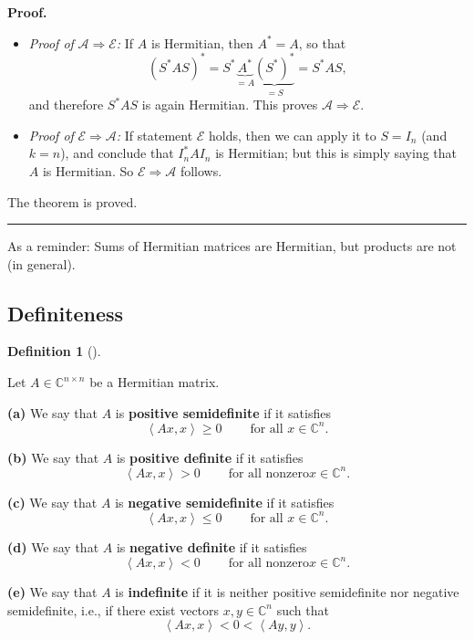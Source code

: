 \documentclass[numbers=enddot,12pt,final,onecolumn,notitlepage]{scrartcl}%
\numberwithin{exer}{subsection}
\theoremstyle{definition}
\newtheorem{defi}[theo]{Definition}
\newenvironment{definition}[1][]
{\begin{defi}[#1]\begin{leftbar}}
{\end{leftbar}\end{defi}}
\newenvironment{proof}[1][Proof]{\noindent\textbf{#1.} }{\ \rule{0.5em}{0.5em}}
\begin{document}
\begin{proof}
\begin{itemize}
\item \textit{Proof of }$\mathcal{A}\Longrightarrow\mathcal{E}$\textit{:} If
$A$ is Hermitian, then $A^{\ast}=A$, so that%
\[
\left(  S^{\ast}AS\right)  ^{\ast}=S^{\ast}\underbrace{A^{\ast}}%
_{=A}\underbrace{\left(  S^{\ast}\right)  ^{\ast}}_{=S}=S^{\ast}AS,
\]
and therefore $S^{\ast}AS$ is again Hermitian. This proves $\mathcal{A}%
\Longrightarrow\mathcal{E}$.

\item \textit{Proof of }$\mathcal{E}\Longrightarrow\mathcal{A}$\textit{:} If
statement $\mathcal{E}$ holds, then we can apply it to $S=I_{n}$ (and $k=n$),
and conclude that $I_{n}^{\ast}AI_{n}$ is Hermitian; but this is simply saying
that $A$ is Hermitian. So $\mathcal{E}\Longrightarrow\mathcal{A}$ follows.
\end{itemize}

The theorem is proved.
\end{proof}

As a reminder: Sums of Hermitian matrices are Hermitian, but products are not
(in general).

\subsection{Definiteness}

\begin{definition}
Let $A\in\mathbb{C}^{n\times n}$ be a Hermitian matrix.

\textbf{(a)} We say that $A$ is \textbf{positive semidefinite} if it satisfies%
\[
\left\langle Ax,x\right\rangle \geq0\ \ \ \ \ \ \ \ \ \ \text{for all }%
x\in\mathbb{C}^{n}.
\]


\textbf{(b)} We say that $A$ is \textbf{positive definite} if it satisfies%
\[
\left\langle Ax,x\right\rangle >0\ \ \ \ \ \ \ \ \ \ \text{for all nonzero
}x\in\mathbb{C}^{n}.
\]


\textbf{(c)} We say that $A$ is \textbf{negative semidefinite} if it satisfies%
\[
\left\langle Ax,x\right\rangle \leq0\ \ \ \ \ \ \ \ \ \ \text{for all }%
x\in\mathbb{C}^{n}.
\]


\textbf{(d)} We say that $A$ is \textbf{negative definite} if it satisfies%
\[
\left\langle Ax,x\right\rangle <0\ \ \ \ \ \ \ \ \ \ \text{for all nonzero
}x\in\mathbb{C}^{n}.
\]


\textbf{(e)} We say that $A$ is \textbf{indefinite} if it is neither positive
semidefinite nor negative semidefinite, i.e., if there exist vectors
$x,y\in\mathbb{C}^{n}$ such that%
\[
\left\langle Ax,x\right\rangle <0<\left\langle Ay,y\right\rangle .
\]

\end{definition}
\end{document}

